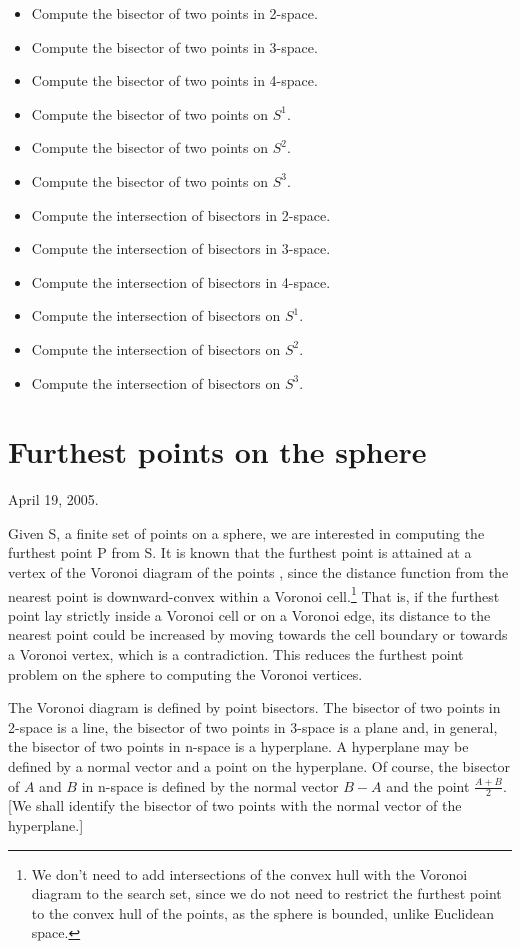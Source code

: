 \documentclass[12pt]{article}
\begin{document}
\begin{itemize}
\item Compute the bisector of two points in 2-space.
\item Compute the bisector of two points in 3-space.
\item Compute the bisector of two points in 4-space.
\item Compute the bisector of two points on $S^1$.
\item Compute the bisector of two points on $S^2$.
\item Compute the bisector of two points on $S^3$.
\item Compute the intersection of bisectors in 2-space.
\item Compute the intersection of bisectors in 3-space.
\item Compute the intersection of bisectors in 4-space.
\item Compute the intersection of bisectors on $S^1$.
\item Compute the intersection of bisectors on $S^2$.
\item Compute the intersection of bisectors on $S^3$.
\end{itemize}

\clearpage

\section{Furthest points on the sphere}

April 19, 2005.

Given S, a finite set of points on a sphere, we are interested in computing
the furthest point P from S.
It is known that the furthest point is attained at a vertex of the 
Voronoi diagram of the points \cite[p. 251]{preparatashamos85},
since the distance function from the nearest point is downward-convex within 
a Voronoi cell.\footnote{We don't need to add intersections of the convex hull 
  with the Voronoi diagram to the search set,
  since we do not need to restrict the furthest point to the convex hull of the points,
  as the sphere is bounded, unlike Euclidean space.}
That is, if the furthest point lay strictly inside a Voronoi cell or on a Voronoi edge, 
its distance to the nearest point could be increased by moving towards the cell boundary 
or towards a Voronoi vertex, which is a contradiction.
This reduces the furthest point problem on the sphere to computing the Voronoi vertices.

The Voronoi diagram is defined by point bisectors.
The bisector of two points in 2-space is a line,
the bisector of two points in 3-space is a plane and, in general,
the bisector of two points in n-space is a hyperplane.
A hyperplane may be defined by a normal vector and a point on the hyperplane.
Of course, the bisector of $A$ and $B$ in n-space is defined by the normal vector $B-A$
and the point $\frac{A+B}{2}$.
[We shall identify the bisector of two points with the normal vector of the hyperplane.]
\end{document}
